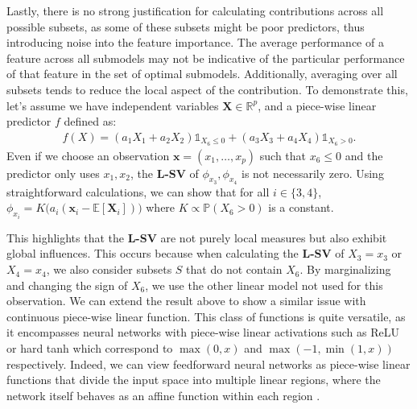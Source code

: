 \documentclass{article}
\newcommand\x{\boldsymbol{x}}
\theoremstyle{plain}
\theoremstyle{definition}
\newtheorem{definition}[theorem]{Definition}
\theoremstyle{remark}
\newcommand{\lsv}{\textcolor{lsv}{\textbf{L-SV}}}
\begin{document}
Lastly, there is no strong justification for calculating contributions across all possible subsets, as some of these subsets might be poor predictors, thus introducing noise into the feature importance. The average performance of a feature across all submodels may not be indicative of the particular performance of that feature in the set of optimal submodels.  Additionally, averaging over all subsets tends to reduce the local aspect of the contribution. To demonstrate this, let's assume  we have independent variables $\boldsymbol{X} \in \mathbb{R}^p$, and a piece-wise linear predictor $f$ defined as: 
\begin{align} \label{eq:linear_switch}
 f(X) = (a_1 X_1 + a_2 X_2) \mathds{1}_{X_{6} \leq 0} + (a_3 X_3 + a_4 X_4) \mathds{1}_{X_{6} > 0}.
\end{align}
Even if we choose an observation $\boldsymbol{x}=(x_1, \dots, x_p)$ such that $x_6 \leq 0$  and the predictor only uses $x_1, x_2$, the \lsv{} of $\phi_{x_3}, \phi_{x_4}$ is not necessarily zero. Using straightforward calculations, we can show that for all {\small $i \in \{3, 4\}$, $\phi_{x_i} = K\Big(a_i(\boldsymbol{x}_i -  \mathbb{E}[\boldsymbol{X}_i])\Big)$} where {\small $K \propto \mathbb{P}(X_6 > 0)$} is a constant.

This highlights that the \lsv{} are not purely local measures but also exhibit global influences.  This occurs because when calculating the \lsv{} of $X_3 = x_3$ or $X_4 = x_4$, we also consider subsets $S$ that do not contain $X_6$. By marginalizing and changing the sign of $X_6$, we use the other linear model not used for this observation. We can extend the result above to show a similar issue with continuous piece-wise linear function.  This class of functions is quite versatile, as it encompasses neural networks with piece-wise linear activations such as ReLU or hard tanh which correspond to $\max(0, x)$ and $\max(-1, \min(1, x))$ respectively. Indeed, we can view feedforward neural networks as piece-wise linear functions that divide the input space into multiple linear regions, where the network itself behaves as an affine function within each region \citep{pascanu2013number, hanin2019complexity, hanin2019deep, chen2022improved}. 

\end{document}

